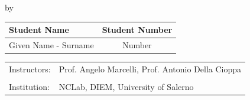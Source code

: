 \begin{titlepage}

\begin{center}

{\makeatletter
\largetitlestyle\fontsize{45}{45}\selectfont\@title
\makeatother}

{\makeatletter
\ifdefvoid{\@subtitle}{}{\titlestyle\fontsize{20}{20}\selectfont\@subtitle}
\makeatother}

\bigskip
\bigskip

by

\bigskip
\bigskip

{\makeatletter
\largetitlestyle\fontsize{25}{25}\selectfont\@author
\makeatother}

\bigskip
\bigskip

\setlength\extrarowheight{2pt}
\begin{tabular}{lc}
    Student Name & Student Number \\\hline
    Given Name - Surname & Number \\
\end{tabular}

\vfill

\begin{tabular}{ll}
    Instructors: & Prof. Angelo Marcelli, Prof. Antonio Della Cioppa \\
    & \\
    Institution: & NCLab, DIEM, University of Salerno \\
\end{tabular}

\vspace{1cm}
\end{center}


\end{titlepage}
